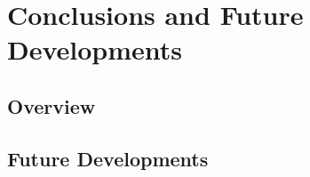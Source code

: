 \chapter{Conclusions and Future Developments}\label{ch:conclusions}

\section{Overview}\label{sec:overview}

\section{Future Developments}\label{sec:future_developments}